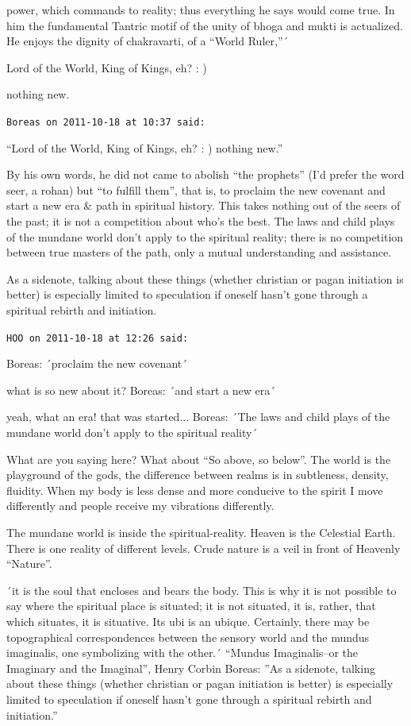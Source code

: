 \begin{footnotesize}
\begin{sffamily}
power, which commands to reality; thus everything he says would come true. In him the fundamental Tantric motif of the unity of bhoga and mukti is actualized. He enjoys the dignity of chakravarti, of a ``World Ruler,''´

Lord of the World, King of Kings, eh? : )

nothing new.

\hfill

\texttt{Boreas on 2011-10-18 at 10:37 said:}

``Lord of the World, King of Kings, eh? : ) nothing new.''

By his own words, he did not came to abolish ``the prophets'' (I'd prefer the word seer, a rohan) but ``to fulfill them'', that is, to proclaim the new covenant and start a new era \& path in spiritual history. This takes nothing out of the seers of the past; it is not a competition about who's the best. The laws and child plays of the mundane world don't apply to the spiritual reality; there is no competition between true masters of the path, only a mutual understanding and assistance.

As a sidenote, talking about these things (whether christian or pagan initiation is better) is especially limited to speculation if oneself hasn't gone through a spiritual rebirth and initiation.

\hfill

\texttt{HOO on 2011-10-18 at 12:26 said:} 

Boreas: ´proclaim the new covenant´ 

what is so new about it? Boreas: ´and start a new era´

yeah, what an era! that was started...  Boreas: ´The laws and child plays of the mundane world don't apply to the spiritual reality´

What are you saying here? What about ``So above, so below''. The world is the playground of the gods, the difference between realms is in subtleness, density, fluidity. When my body is less dense and more conducive to the spirit I move differently and people receive my vibrations differently.

The mundane world is inside the spiritual-reality. Heaven is the Celestial Earth. There is one reality of different levels. Crude nature is a veil in front of Heavenly ``Nature''.

´it is the soul that encloses and bears the body. This is why it is not possible to say where the spiritual place is situated; it is not situated, it is, rather, that which situates, it is situative. Its ubi is an ubique. Certainly, there may be topographical correspondences between the sensory world and the mundus imaginalis, one symbolizing with the other.´ ``Mundus Imaginalis--or the Imaginary and the Imaginal'', Henry Corbin  Boreas: ''As a sidenote, talking about these things (whether christian or pagan initiation is better) is especially limited to speculation if oneself hasn't gone through a spiritual rebirth and initiation.''


\end{sffamily}
\end{footnotesize}
